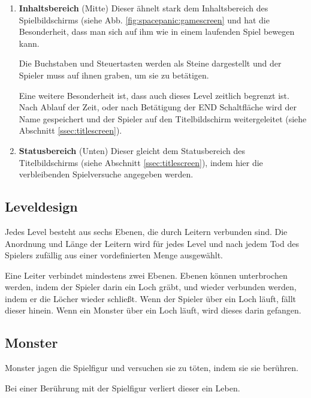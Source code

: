 \documentclass[12pt]{article}
\begin{document}
\begin{enumerate}
\item \textbf{Inhaltsbereich} (Mitte) \newline
Dieser ähnelt stark dem Inhaltsbereich des Spielbildschirms (siehe Abb. \ref{fig:spacepanic:gamescreen} und hat die Besonderheit, dass man sich auf ihm wie in einem laufenden Spiel bewegen kann.

Die Buchstaben und Steuertasten werden als Steine dargestellt und der Spieler muss auf ihnen graben, um sie zu betätigen.

Eine weitere Besonderheit ist, dass auch dieses Level zeitlich begrenzt ist. Nach Ablauf der Zeit, oder nach Betätigung der END Schaltfläche wird der Name gespeichert und der Spieler auf den Titelbildschirm weitergeleitet (siehe Abschnitt \ref{ssec:titlescreen}).

\item \textbf{Statusbereich} (Unten) \newline
	Dieser gleicht dem Statusbereich des Titelbildschirms (siehe Abschnitt \ref{ssec:titlescreen}), indem hier die verbleibenden Spielversuche angegeben werden.
\end{enumerate}




\subsection{Leveldesign}
	Jedes Level besteht aus sechs Ebenen, die durch Leitern verbunden sind. Die Anordnung und Länge der Leitern wird für jedes Level und nach jedem Tod des Spielers zufällig aus einer vordefinierten Menge ausgewählt. 
    
    Eine Leiter verbindet mindestens zwei Ebenen. Ebenen können unterbrochen werden, indem der Spieler darin ein Loch gräbt, und wieder verbunden werden, indem er die Löcher wieder schließt. Wenn der Spieler über ein Loch läuft, fällt dieser hinein. Wenn ein Monster über ein Loch läuft, wird dieses darin gefangen.



\subsection{Monster} \label{ssec:Monster}
	Monster jagen die Spielfigur und versuchen sie zu töten, indem sie sie berühren.
    
    Bei einer Berührung mit der Spielfigur verliert dieser ein Leben.
    
\end{document}
